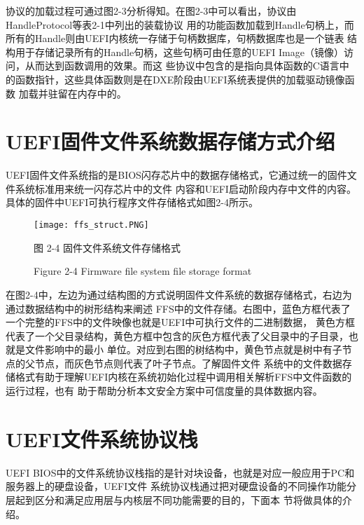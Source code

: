 \par 协议的加载过程可通过图2-3分析得知。在图2-3中可以看出，协议由HandleProtocol等表2-1中列出的装载协议
用的功能函数加载到Handle句柄上，而所有的Handle则由UEFI内核统一存储于句柄数据库，句柄数据库也是一个链表
结构用于存储记录所有的Handle句柄，这些句柄可由任意的UEFI Image（镜像）访问，从而达到函数调用的效果。而这
些协议中包含的是指向具体函数的C语言中的函数指针，这些具体函数则是在DXE阶段由UEFI系统表提供的加载驱动镜像函数
加载并驻留在内存中的。

%
%
\section{UEFI固件文件系统数据存储方式介绍}
UEFI固件文件系统指的是BIOS闪存芯片中的数据存储格式，它通过统一的固件文件系统标准用来统一闪存芯片中的文件
内容和UEFI启动阶段内存中文件的内容\cite{chinese21}。具体的固件中UEFI可执行程序文件存储格式如图2-4所示。

\begin{figure}[htb]
    \vspace{0cm}   
    \setlength{\abovecaptionskip}{0.3cm}  
	\centering
    \texttt{[image: ffs\_struct.PNG]}
    \caption*{图 2-4 固件文件系统文件存储格式}
    \setlength{\belowcaptionskip}{-0.7cm}
    \caption*{Figure 2-4 Firmware file system file storage format}
\end{figure}

在图2-4中，左边为通过结构图的方式说明固件文件系统的数据存储格式，右边为通过数据结构中的树形结构来阐述
FFS中的文件存储。右图中，蓝色方框代表了一个完整的FFS中的文件映像也就是UEFI中可执行文件的二进制数据，
黄色方框代表了一个父目录结构，黄色方框中包含的灰色方框代表了父目录中的子目录，也就是文件影响中的最小
单位。对应到右图的树结构中，黄色节点就是树中有子节点的父节点，而灰色节点则代表了叶子节点。了解固件文件
系统中的文件数据存储格式有助于理解UEFI内核在系统初始化过程中调用相关解析FFS中文件函数的运行过程，也有
助于帮助分析本文安全方案中可信度量的具体数据内容。
%
%
\section{UEFI文件系统协议栈}
UEFI BIOS中的文件系统协议栈指的是针对块设备，也就是对应一般应用于PC和服务器上的硬盘设备，UEFI文件
系统协议栈通过把对硬盘设备的不同操作功能分层起到区分和满足应用层与内核层不同功能需要的目的，下面本
节将做具体的介绍。
